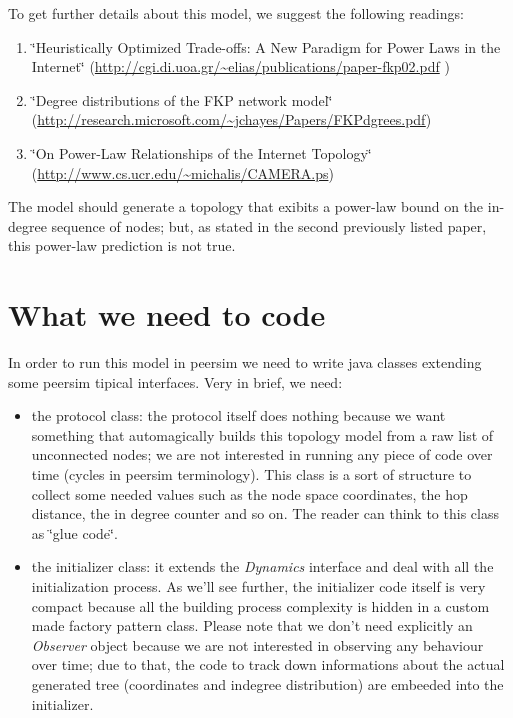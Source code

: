 \documentclass[a4paper,12pt]{article}
\begin{document}
To get further details about this model, we suggest the following
readings:

\begin{enumerate}

\item \char`\"{}Heuristically Optimized Trade-offs: A New Paradigm for Power
Laws in the Internet\char`\"{} 
(\url{http://cgi.di.uoa.gr/~elias/publications/paper-fkp02.pdf} )

\item  \char`\"{}Degree distributions
of the FKP network model\char`\"{} \\
(\url{http://research.microsoft.com/~jchayes/Papers/FKPdgrees.pdf}) 

\item\char`\"{}On Power-Law
Relationships of the Internet Topology\char`\"{}\\ 
(\url{http://www.cs.ucr.edu/~michalis/CAMERA.ps})

\end{enumerate}

The model
should generate a topology that exibits a power-law bound on the in-degree
sequence of nodes; but, as stated in the second previously listed paper,
 this power-law
prediction is not true.

\section{What we need to code}

In order to run this model in peersim we need to write java classes 
extending some peersim tipical interfaces. Very in brief, we need:

\begin{itemize}

\item the protocol class: the protocol itself does nothing because 
we want something that automagically builds this topology model from 
a raw list of unconnected nodes; we are not interested in running any 
piece of code over time (cycles in peersim terminology). This class 
is a sort of structure to collect some needed values such as the node 
space coordinates, the hop distance, the in degree counter and so on. 
The reader can think to this class as \char`\"{}glue code\char`\"{}.
 
\item the initializer class: it extends the \emph{Dynamics} interface and 
deal with all the initialization process. As we'll see further, the 
initializer code itself is very compact because all the building process 
complexity is hidden in a custom made factory pattern class. Please note 
that we don't need explicitly an \emph{Observer} object  because we are 
not interested in observing any behaviour over time; due to that, the code 
to track down informations about the actual generated tree (coordinates 
and indegree distribution) are embeeded into the initializer. 

\end{itemize}
\end{document}
